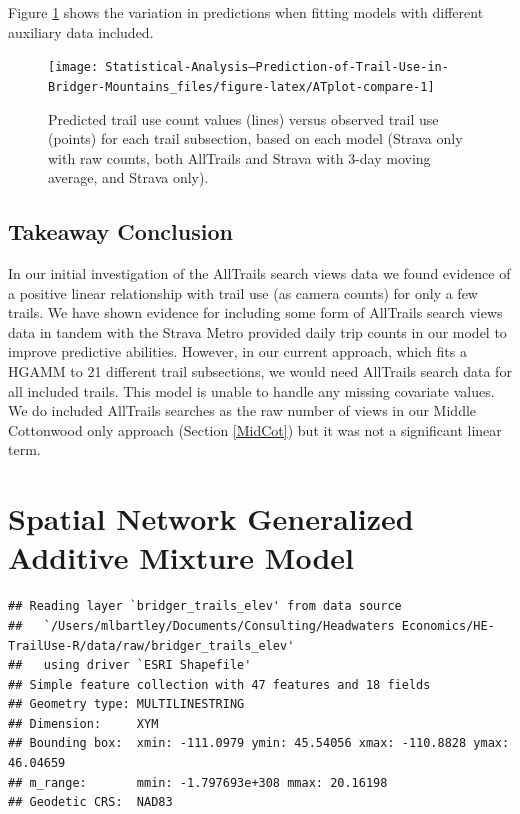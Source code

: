 \documentclass[
]{book}
\begin{document}
Figure \ref{fig:ATplot-compare} shows the variation in predictions when fitting models with different auxiliary data included.

\begin{figure}

{\centering \texttt{[image: Statistical-Analysis--Prediction-of-Trail-Use-in-Bridger-Mountains\_files/figure-latex/ATplot-compare-1]} 

}

\caption{Predicted trail use count values (lines) versus observed trail use (points) for each trail subsection, based on each model (Strava only with raw counts, both AllTrails and Strava with 3-day moving average, and Strava only).}\label{fig:ATplot-compare}
\end{figure}

\hypertarget{takeaway-conclusion}{%
\section{Takeaway Conclusion}\label{takeaway-conclusion}}

In our initial investigation of the AllTrails search views data we found evidence of a positive linear relationship with trail use (as camera counts) for only a few trails. We have shown evidence for including some form of AllTrails search views data in tandem with the Strava Metro provided daily trip counts in our model to improve predictive abilities. However, in our current approach, which fits a HGAMM to 21 different trail subsections, we would need AllTrails search data for all included trails. This model is unable to handle any missing covariate values. We do included AllTrails searches as the raw number of views in our Middle Cottonwood only approach (Section \ref{MidCot}) but it was not a significant linear term.

\hypertarget{Spatial}{%
\chapter{Spatial Network Generalized Additive Mixture Model}\label{Spatial}}

\begin{verbatim}
## Reading layer `bridger_trails_elev' from data source 
##   `/Users/mlbartley/Documents/Consulting/Headwaters Economics/HE-TrailUse-R/data/raw/bridger_trails_elev' 
##   using driver `ESRI Shapefile'
## Simple feature collection with 47 features and 18 fields
## Geometry type: MULTILINESTRING
## Dimension:     XYM
## Bounding box:  xmin: -111.0979 ymin: 45.54056 xmax: -110.8828 ymax: 46.04659
## m_range:       mmin: -1.797693e+308 mmax: 20.16198
## Geodetic CRS:  NAD83
\end{verbatim}
\end{document}
